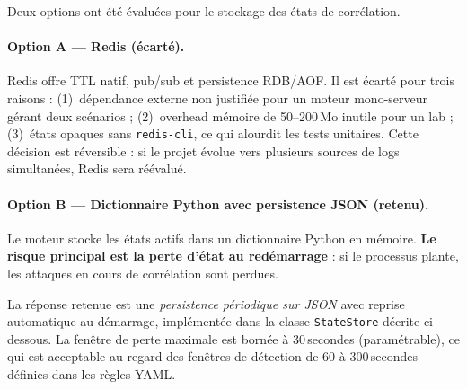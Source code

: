 \documentclass[11pt,a4paper]{article}
\begin{document}
Deux options ont été évaluées pour le stockage des états de corrélation.

\paragraph{Option A --- Redis (écarté).}
Redis offre TTL natif, pub/sub et persistence RDB/AOF.
Il est écarté pour trois raisons : (1)~dépendance externe non justifiée
pour un moteur mono-serveur gérant deux scénarios ; (2)~overhead mémoire
de 50--200\,Mo inutile pour un lab ; (3)~états opaques sans \texttt{redis-cli},
ce qui alourdit les tests unitaires.
Cette décision est réversible : si le projet évolue vers plusieurs
sources de logs simultanées, Redis sera réévalué.

\paragraph{Option B --- Dictionnaire Python avec persistence JSON (retenu).}
Le moteur stocke les états actifs dans un dictionnaire Python en mémoire.
\textbf{Le risque principal est la perte d'état au redémarrage} : si le
processus plante, les attaques en cours de corrélation sont perdues.

La réponse retenue est une \emph{persistence périodique sur JSON}
avec reprise automatique au démarrage, implémentée dans la classe
\texttt{StateStore} décrite ci-dessous.
La fenêtre de perte maximale est bornée à 30\,secondes (paramétrable),
ce qui est acceptable au regard des fenêtres de détection de
60 à 300\,secondes définies dans les règles YAML.
\end{document}
